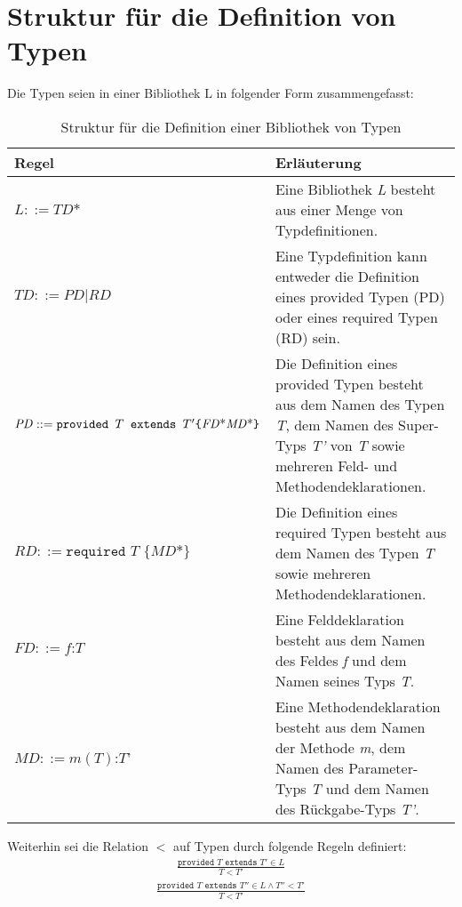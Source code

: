 \documentclass[a4paper,12pt]{article}
\begin{document}
\section{Struktur für die Definition von Typen}
Die Typen seien in einer Bibliothek $\text{L}$ in folgender Form zusammengefasst:
\begin{table}[H]
\centering
\begin{tabular}{|p{5.5cm}|p{8.5cm}|}
\hline
\hline
\centering\textbf{Regel} & \textbf{Erläuterung} \\
\hline
\hline
$\mathit{L} ::= \mathit{TD}\text{*}$ & Eine Bibliothek \emph{L} besteht aus einer Menge von Typdefinitionen.\\
\hline
$\mathit{TD} ::= \mathit{PD} | \mathit{RD}$ & Eine Typdefinition kann entweder die Definition eines provided Typen (PD) oder eines required Typen (RD) sein.\\
\hline
$\mathit{PD} ::= \newline\texttt{provided }T \texttt{ extends } T' \newline  \texttt{\{} \mathit{FD}\text{*} \mathit{MD}\text{*}\texttt{\}}$& Die Definition eines provided Typen besteht aus dem Namen des Typen \emph{T}, dem Namen des Super-Typs \emph{T'} von \emph{T} sowie mehreren Feld- und Methodendeklarationen.\\
\hline
$\mathit{RD} ::= \texttt{required } T \texttt{ \{}\mathit{MD}\text{*}\texttt{\}}$ & Die Definition eines required Typen besteht aus dem Namen des Typen \emph{T} sowie mehreren Methodendeklarationen.\\
\hline
$\mathit{FD} ::= \mathit{f} \texttt{:} T$ & Eine Felddeklaration besteht aus dem Namen des Feldes \emph{f} und dem Namen seines Typs \emph{T}.\\
\hline
$\mathit{MD} ::= \mathit{m(T)}\texttt{:}\mathit{T}$' & Eine Methodendeklaration besteht aus dem Namen der Methode \emph{m}, dem Namen des Parameter-Typs \emph{T} und dem Namen des Rückgabe-Typs \emph{T'}.\\
\hline
\hline
\end{tabular}
\caption{Struktur für die Definition einer Bibliothek von Typen}
 \label{tab:eIShort}
\end{table}
\noindent
Weiterhin sei die Relation $<$ auf Typen durch folgende Regeln definiert:
\begin{gather*}
\frac{\texttt{provided }T \texttt{ extends } T' \in L}{T < T'}
\end{gather*}
\begin{gather*}
\frac{\texttt{provided } T \texttt{ extends } T'' \in L \wedge T'' < T'}{T < T'}
\end{gather*}
\end{document}
